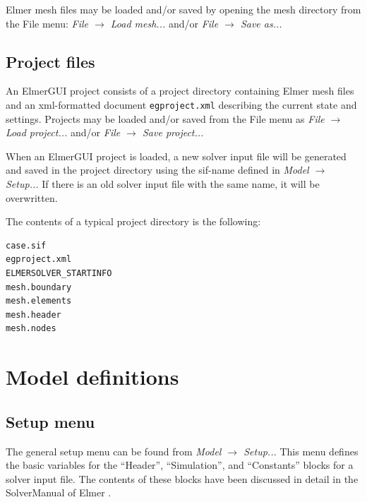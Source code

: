 \documentclass[a4paper,12pt]{article}
\newcommand{\menu}[2]{{\it \vskip2mm #1 $\rightarrow$ #2 \vskip2mm}}
\begin{document}
Elmer mesh files may be loaded and/or saved by opening the mesh directory from the File menu:
\menu{File}{Load mesh...}
\noindent and/or
\menu{File}{Save as...}

\subsection{Project files}

An ElmerGUI project consists of a project directory containing Elmer mesh files and an xml-formatted 
document {\tt egproject.xml} describing the current state and settings. Projects may be loaded and/or saved from the File menu as
\menu{File}{Load project...}
\noindent and/or
\menu{File}{Save project...}

When an ElmerGUI project is loaded, a new solver input file will be generated and saved
in the project directory using the sif-name defined in
\menu{Model}{Setup...}
\noindent If there is an old solver input file with the same name, it will be overwritten.

The contents of a typical project directory is the following:

\begin{footnotesize}
\begin{verbatim}
case.sif 
egproject.xml
ELMERSOLVER_STARTINFO 
mesh.boundary 
mesh.elements 
mesh.header 
mesh.nodes
\end{verbatim}
\end{footnotesize}

\section{Model definitions}

\subsection{Setup menu}

The general setup menu can be found from
\menu{Model}{Setup...}
\noindent This menu defines the basic variables for the ``Header'', ``Simulation'',
and ``Constants'' blocks for a solver input file. The contents of these blocks have
been discussed in detail in the SolverManual of Elmer \cite{ElmerHome}.
\end{document}
